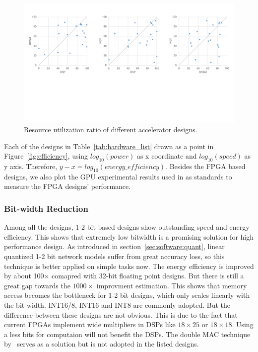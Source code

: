 \begin{figure}[ht]
    \centering
    \includegraphics[width=1.0\columnwidth]{fig/resource.pdf}
    \caption{Resource utilization ratio of different accelerator designs.}
    \label{fig:resource}
\end{figure}

Each of the designs in Table~\ref{tab:hardware_list} drawn as a point in Figure~\ref{fig:efficiency}, using $log_{10}(power)$ as x coordinate and $log_{10}(speed)$ as y axis. Therefore, $y-x=log_{10}(energy\_efficiency)$. Besides the FPGA based designs, we also plot the GPU experimental results used in \cite{guo2017angel, han2017ese} as standards to measure the FPGA designs' performance.

\subsubsection{Bit-width Reduction} Among all the designs, 1-2 bit based designs show outstanding speed and energy efficiency. This shows that extremely low bitwidth is a promising solution for high performance design. As introduced in section~\ref{sec:software:quant}, linear quantized 1-2 bit network models suffer from great accuracy loss, so this technique is better applied on simple tasks now. The energy efficiency is improved by about 100$\times$ comapred with 32-bit floating point designs. But there is still a great gap towards the $1000\times$ improvment estimation. This shows that memory access becomes the bottleneck for 1-2 bit designs, which only scales linearly with the bit-width. INT16/8, INT16 and INT8 are commonly adopted. But the difference between these designs are not obvious. This is due to the fact that current FPGAs implement wide multipliers in DSPs like $18\times 25$ or $18\times 18$. Using a less bits for computaion will not benefit the DSPs. The double MAC technique by~\cite{nguyen2017double} serves as a solution but is not adopted in the listed designs.

